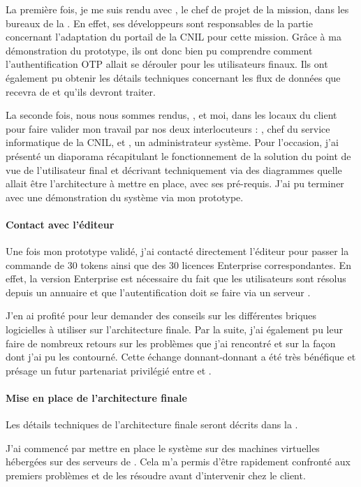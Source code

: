 La première fois, je me suis rendu avec \asegir{}, le chef de projet de la mission, dans les bureaux de la \abugan.
En effet, ses développeurs sont responsables de la partie concernant l'adaptation du portail \atypo{} de la CNIL pour cette mission.
Grâce à ma démonstration du prototype, ils ont donc bien pu comprendre comment l'authentification OTP allait se dérouler pour les utilisateurs finaux.
Ils ont également pu obtenir les détails techniques concernant les flux de données que \atypo{} recevra de \alinotp{} et qu'ils devront traiter.

La seconde fois, nous nous sommes rendus, \apakou, \asegir{} et moi, dans les locaux du client pour faire valider mon travail par nos deux interlocuteurs : \ahbt, chef du service informatique de la CNIL, et \amimiette, un administrateur système.
Pour l'occasion, j'ai présenté un diaporama récapitulant le fonctionnement de la solution du point de vue de l'utilisateur final et décrivant techniquement via des diagrammes quelle allait être l'architecture à mettre en place, avec ses pré-requis.
J'ai pu terminer avec une démonstration du système via mon prototype.

\paragraph{Contact avec l'éditeur}
Une fois mon prototype validé, j'ai contacté directement l'éditeur \alse{} pour passer la commande de 30 tokens ainsi que des 30 licences \alinotp{} Enterprise correspondantes.
En effet, la version Enterprise est nécessaire du fait que les utilisateurs sont résolus depuis un annuaire \aad{} et que l'autentification doit se faire via un serveur \aradius.

J'en ai profité pour leur demander des conseils sur les différentes briques logicielles à utiliser sur l'architecture finale.
Par la suite, j'ai également pu leur faire de nombreux retours sur les problèmes que j'ai rencontré et sur la façon dont j'ai pu les contourné.
Cette échange donnant-donnant a été très bénéfique et présage un futur partenariat privilégié entre \asmile{} et \alse{}.

\paragraph{Mise en place de l'architecture finale}
Les détails techniques de l'architecture finale seront décrits dans la .

J'ai commencé par mettre en place le système sur des machines virtuelles hébergées sur des serveurs de \asmile{}.
Cela m'a permis d'être rapidement confronté aux premiers problèmes et de les résoudre avant d'intervenir chez le client.


